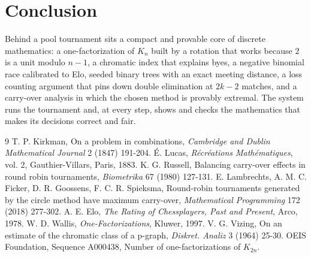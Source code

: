 \documentclass[11pt]{article}
\begin{document}
\section{Conclusion}

Behind a pool tournament sits a compact and provable core of discrete mathematics:
a one-factorization of $K_n$ built by a rotation that works because $2$ is a unit
modulo $n-1$, a chromatic index that explains byes, a negative binomial race
calibrated to Elo, seeded binary trees with an exact meeting distance, a loss
counting argument that pins down double elimination at $2k-2$ matches, and a
carry-over analysis in which the chosen method is provably extremal. The system
runs the tournament and, at every step, shows and checks the mathematics that makes
its decisions correct and fair.

\begin{thebibliography}{9}\small
{} T. P. Kirkman, On a problem in combinations, \emph{Cambridge and Dublin Mathematical Journal} 2 (1847) 191-204.
 \'E. Lucas, \emph{R\'ecr\'eations Math\'ematiques}, vol. 2, Gauthier-Villars, Paris, 1883.
 K. G. Russell, Balancing carry-over effects in round robin tournaments, \emph{Biometrika} 67 (1980) 127-131.
 E. Lambrechts, A. M. C. Ficker, D. R. Goossens, F. C. R. Spieksma, Round-robin tournaments generated by the circle method have maximum carry-over, \emph{Mathematical Programming} 172 (2018) 277-302.
 A. E. Elo, \emph{The Rating of Chessplayers, Past and Present}, Arco, 1978.
 W. D. Wallis, \emph{One-Factorizations}, Kluwer, 1997.
 V. G. Vizing, On an estimate of the chromatic class of a p-graph, \emph{Diskret. Analiz} 3 (1964) 25-30.
 OEIS Foundation, Sequence A000438, Number of one-factorizations of $K_{2n}$.
\end{thebibliography}
\end{document}
